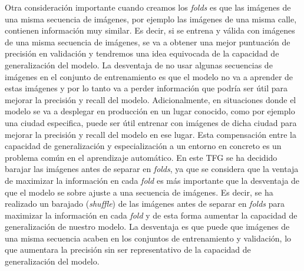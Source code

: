 Otra consideración importante cuando creamos los \textit{folds} es que las imágenes de una misma secuencia de imágenes, por ejemplo las imágenes de una misma calle, contienen información muy similar. Es decir, si se entrena y válida con imágenes de una misma secuencia de imágenes, se va a obtener una mejor puntuación de precisión en validación y tendremos una idea equivocada de la capacidad de generalización del modelo. La desventaja de no usar algunas secuencias de imágenes en el conjunto de entrenamiento es que el modelo no va a aprender de estas imágenes y por lo tanto va a perder información que podría ser útil para mejorar la precisión y recall del modelo. Adicionalmente, en situaciones donde el modelo se va a desplegar en producción en un lugar conocido, como por ejemplo una ciudad especifica, puede ser útil entrenar con imágenes de dicha ciudad para mejorar la precisión y recall del modelo en ese lugar. Esta compensación entre la capacidad de generalización y especialización a un entorno en concreto es un problema común en el aprendizaje automático. En este TFG se ha decidido barajar las imágenes antes de separar en \textit{folds}, ya que se considera que la ventaja de maximizar la información en cada \textit{fold} es más importante que la desventaja de que el modelo se sobre ajuste a una secuencia de imágenes. Es decir, se ha realizado un barajado (\textit{shuffle}) de las imágenes antes de separar en \textit{folds} para maximizar la información en cada \textit{fold} y de esta forma aumentar la capacidad de generalización de nuestro modelo. La desventaja es que puede que imágenes de una misma secuencia acaben en los conjuntos de entrenamiento y validación, lo que aumentara la precisión sin ser representativo de la capacidad de generalización del modelo.
